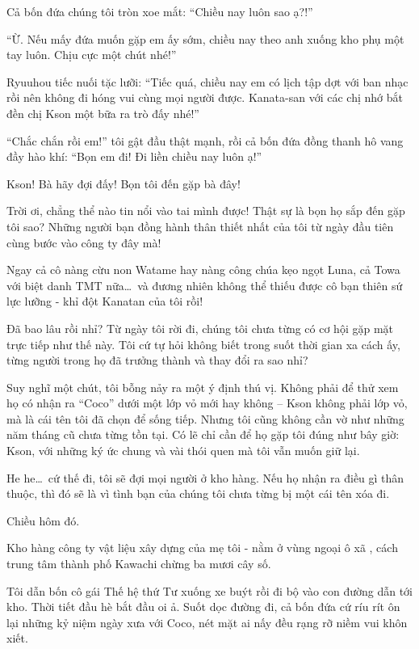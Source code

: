 \documentclass[../main.tex]{subfiles}
\begin{document}
Cả bốn đứa chúng tôi tròn xoe mắt: ``Chiều nay luôn sao ạ?!''

``Ừ. Nếu mấy đứa muốn gặp em ấy sớm, chiều nay theo anh xuống kho phụ một tay luôn. Chịu cực một chút nhé!''

Ryuuhou tiếc nuối tặc lưỡi: ``Tiếc quá, chiều nay em có lịch tập dợt với ban nhạc rồi nên không đi hóng vui cùng mọi người được. Kanata-san với các chị nhớ bắt đền chị Kson một bữa ra trò đấy nhé!''

``Chắc chắn rồi em!'' tôi gật đầu thật mạnh, rồi cả bốn đứa đồng thanh hô vang đầy hào khí: ``Bọn em đi! Đi liền chiều nay luôn ạ!''

Kson! Bà hãy đợi đấy! Bọn tôi đến gặp bà đây!


Trời ơi, chẳng thể nào tin nổi vào tai mình được! Thật sự là bọn họ sắp đến gặp tôi sao? Những người bạn đồng hành thân thiết nhất của tôi từ ngày đầu tiên cùng bước vào công ty đây mà!

Ngay cả cô nàng cừu non Watame hay nàng công chúa kẹo ngọt Luna, cả Towa với biệt danh TMT nữa\dots\ và đương nhiên không thể thiếu được cô bạn thiên sứ lực lưỡng - khỉ đột Kanatan của tôi rồi!

Đã bao lâu rồi nhỉ? Từ ngày tôi rời đi, chúng tôi chưa từng có cơ hội gặp mặt trực tiếp như thế này. Tôi cứ tự hỏi không biết trong suốt thời gian xa cách ấy, từng người trong họ đã trưởng thành và thay đổi ra sao nhỉ?

Suy nghĩ một chút, tôi bỗng nảy ra một ý định thú vị. Không phải để thử xem họ có nhận ra ``Coco'' dưới một lớp vỏ mới hay không -- Kson không phải lớp vỏ, mà là cái tên tôi đã chọn để sống tiếp. Nhưng tôi cũng không cần vờ như những năm tháng cũ chưa từng tồn tại. Có lẽ chỉ cần để họ gặp tôi đúng như bây giờ: Kson, với những ký ức chung và vài thói quen mà tôi vẫn muốn giữ lại.

He he\dots\ cứ thế đi, tôi sẽ đợi mọi người ở kho hàng. Nếu họ nhận ra điều gì thân thuộc, thì đó sẽ là vì tình bạn của chúng tôi chưa từng bị một cái tên xóa đi.


Chiều hôm đó.

Kho hàng công ty vật liệu xây dựng của mẹ tôi - nằm ở vùng ngoại ô xã , cách trung tâm thành phố Kawachi chừng ba mươi cây số.

Tôi dẫn bốn cô gái Thế hệ thứ Tư xuống xe buýt rồi đi bộ vào con đường dẫn tới kho. Thời tiết đầu hè bắt đầu oi ả. Suốt dọc đường đi, cả bốn đứa cứ ríu rít ôn lại những kỷ niệm ngày xưa với Coco, nét mặt ai nấy đều rạng rỡ niềm vui khôn xiết.
\end{document}
